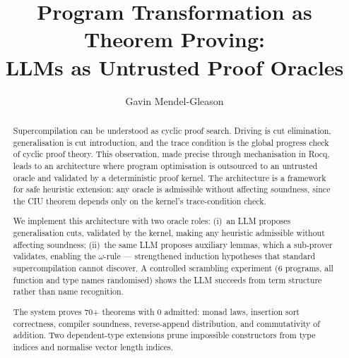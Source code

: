 \documentclass[runningheads]{llncs}
\title{Program Transformation as Theorem Proving:\\
       LLMs as Untrusted Proof Oracles}
\author{Gavin Mendel-Gleason}
\institute{Scidonia Limited\\
\email{gavin@scidonia.ai}}
\begin{document}
\sloppy
\maketitle

\begin{abstract}
Supercompilation can be understood as cyclic proof search.  Driving is cut elimination, generalisation
is cut introduction, and the trace condition is the global progress check of
cyclic proof theory.  This observation, made precise through mechanisation in
Rocq, leads to an architecture where program optimisation is outsourced to an
untrusted oracle and validated by a deterministic proof kernel.
The architecture is a framework for safe heuristic extension:
any oracle is admissible without affecting soundness, since the CIU
theorem depends only on the kernel's trace-condition check.

We implement this architecture with two oracle roles: (i)~an LLM proposes
generalisation cuts, validated by the kernel, making any heuristic admissible
without affecting soundness; (ii)~the same LLM proposes auxiliary lemmas, which
a sub-prover validates, enabling the $\omega$-rule --- strengthened induction
hypotheses that standard supercompilation cannot discover.  A controlled
scrambling experiment (6 programs, all function and type names randomised)
shows the LLM succeeds from term structure rather than name recognition.

The system proves 70+ theorems with 0 admitted: monad laws, insertion sort
correctness, compiler soundness, reverse-append distribution, and commutativity
of addition.  Two dependent-type extensions prune impossible constructors
from type indices and normalise vector length indices.
\end{abstract}














\end{document}
